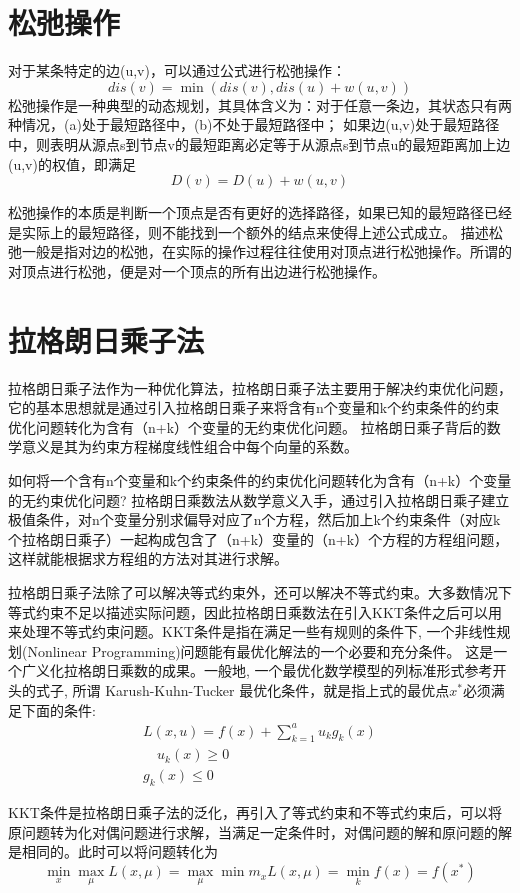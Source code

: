 \section{松弛操作}\label{sec:松弛操作}
对于某条特定的边(u,v)，可以通过公式进行松弛操作：
\begin{equation}
    dis(v) = \min(dis(v),dis(u)+w(u,v))\label{eq:equation}
\end{equation}
松弛操作是一种典型的动态规划，其具体含义为：对于任意一条边，其状态只有两种情况，(a)处于最短路径中，(b)不处于最短路径中；
如果边(u,v)处于最短路径中，则表明从源点s到节点v的最短距离必定等于从源点s到节点u的最短距离加上边(u,v)的权值，即满足
\begin{equation}
    D(v) = D(u) + w(u,v)\label{eq:equation2}
\end{equation}

松弛操作的本质是判断一个顶点是否有更好的选择路径，如果已知的最短路径已经是实际上的最短路径，则不能找到一个额外的结点来使得上述公式成立。
描述松弛一般是指对边的松弛，在实际的操作过程往往使用对顶点进行松弛操作。所谓的对顶点进行松弛，便是对一个顶点的所有出边进行松弛操作。


\section{拉格朗日乘子法}\label{sec:拉格朗日乘子法}
拉格朗日乘子法作为一种优化算法，拉格朗日乘子法主要用于解决约束优化问题，它的基本思想就是通过引入拉格朗日乘子来将含有n个变量和k个约束条件的约束优化问题转化为含有（n+k）个变量的无约束优化问题。
拉格朗日乘子背后的数学意义是其为约束方程梯度线性组合中每个向量的系数。

如何将一个含有n个变量和k个约束条件的约束优化问题转化为含有（n+k）个变量的无约束优化问题?
拉格朗日乘数法从数学意义入手，通过引入拉格朗日乘子建立极值条件，对n个变量分别求偏导对应了n个方程，然后加上k个约束条件（对应k个拉格朗日乘子）一起构成包含了（n+k）变量的（n+k）个方程的方程组问题，这样就能根据求方程组的方法对其进行求解。

拉格朗日乘子法除了可以解决等式约束外，还可以解决不等式约束。大多数情况下等式约束不足以描述实际问题，因此拉格朗日乘数法在引入KKT条件之后可以用来处理不等式约束问题。KKT条件是指在满足一些有规则的条件下, 一个非线性规划(Nonlinear Programming)问题能有最优化解法的一个必要和充分条件。
这是一个广义化拉格朗日乘数的成果。一般地, 一个最优化数学模型的列标准形式参考开头的式子, 所谓 Karush-Kuhn-Tucker 最优化条件，就是指上式的最优点$x^*$必须满足下面的条件:
\begin{equation}
    \left.
    \begin{array}  { l  }
    { L ( x , u ) = f ( x ) + \sum _ { k = 1 } ^ { a } u _ { k } g _ { k } ( x ) }
        \\ { \quad u _ { k } (x) \geq 0 }
        \\ { g _ { k } ( x ) \leq 0 }
    \end{array}
    \right.\label{eq:equation3}
\end{equation}

KKT条件是拉格朗日乘子法的泛化，再引入了等式约束和不等式约束后，可以将原问题转为化对偶问题进行求解，当满足一定条件时，对偶问题的解和原问题的解是相同的。此时可以将问题转化为
\begin{equation}
    \min_{x}\max _{\mu}L(x, \mu)= \max _{\mu}\min m_{x}L(x, \mu)= \min _{k}f(x)=f(x^{*})\label{eq:equation4}
\end{equation}
